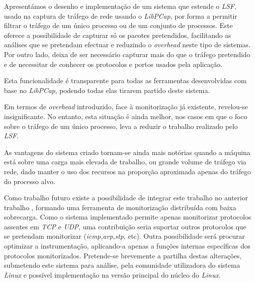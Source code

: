 \documentclass[a4paper]{llncs}
\begin{document}
Apresentámos o desenho e implementação de um sistema que estende o \textit{LSF}, usado na captura de tráfego de rede usando o \textit{LibPCap}, por forma a permitir filtrar o tráfego de um único processo ou de um conjunto de processos.
 Este oferece a possibilidade de capturar só os pacotes pretendidos, facilitando as análises que se pretendam efectuar e reduzindo o \textit{overhead} neste tipo de sistemas.
 Por outro lado, deixa de ser necessário capturar mais do que o tráfego pretendido e de necessitar de conhecer os protocolos e portos usados pela aplicação.

Esta funcionalidade é transparente para todas as ferramentas desenvolvidas com base no \textit{LibPCap}, podendo todas elas tirarem partido deste sistema.

Em termos de \textit{overhead} introduzido, face à monitorização já existente, revelou-se insignificante.
 No entanto, esta situação é ainda melhor, nos casos em que o foco sobre o tráfego de um único processo, leva a reduzir o trabalho realizado pelo \textit{LSF}.

As vantagens do sistema criado tornam-se ainda mais notórias quando a máquina está sobre uma carga mais elevada de trabalho, ou grande volume de tráfego via rede, dado manter o uso dos recursos na proporção aproximada apenas do tráfego do processo alvo.

Como trabalho futuro existe a possibilidade de integrar este trabalho no anterior trabalho \cite{duarte10,Farruca:2009}, formando uma ferramenta de monitorização distribuída com baixa sobrecarga.
 Como o sistema implementado permite apenas monitorizar protocolos assentes em \textit{TCP} e \textit{UDP}, uma contribuição seria suportar outros protocolos que se pretendam monitorizar (\textit{icmp,arp,stp}, etc).
 Outra possibilidade será procurar optimizar a instrumentação, aplicando-a apenas a funções internas específicas dos protocolos monitorizados.
 Pretende-se brevemente a partilha destas alterações, submetendo este sistema para análise, pela comunidade utilizadora do sistema \textit{Linux} e possível implementação na versão principal do núcleo do \textit{Linux}.




\end{document}
